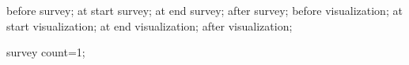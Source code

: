 {


  \attribute before survey;
  \attribute at start survey;
  \attribute at end survey;
  \attribute after survey;
  \attribute before visualization;
  \attribute at start visualization;
  \attribute at end visualization;
  \attribute after visualization;
  
  
  \attribute survey count=1;

}
